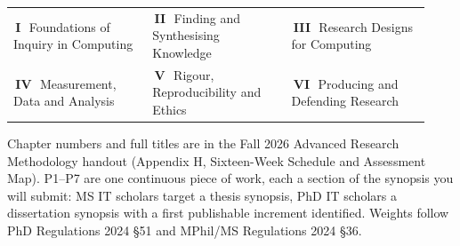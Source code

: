 \documentclass[10pt,a4paper]{article}
\makeatletter
\newcommand{\chipw}[2]{{\setlength{\fboxsep}{1.3pt}\colorbox{#1}{%
  \fontsize{6.4}{7}\selectfont\bfseries\color{white}\,#2\,}}}
\newcommand{\legend}[6]{{\fontsize{6.6}{8}\selectfont\color{sub}%
  \begin{tabular}{@{}p{0.31\linewidth}p{0.31\linewidth}p{0.31\linewidth}@{}}
  \chipw{p1}{I}\ #1 & \chipw{p2}{II}\ #2 & \chipw{p3}{III}\ #3 \\[1pt]
  \chipw{p4}{IV}\ #4 & \chipw{p5}{V}\ #5 & \chipw{p6}{VI}\ #6
  \end{tabular}}}
\makeatother
\begin{document}
\vspace{4pt}
\legend{Foundations of Inquiry in Computing}{Finding and Synthesising Knowledge}{Research Designs for Computing}
       {Measurement, Data and Analysis}{Rigour, Reproducibility and Ethics}{Producing and Defending Research}

\vspace{2pt}
{\fontsize{6.3}{7.6}\selectfont\color{neutral}%
Chapter numbers and full titles are in the Fall 2026 Advanced Research Methodology handout (Appendix H, Sixteen-Week Schedule and Assessment Map). P1--P7 are one continuous piece of work, each a section of the synopsis you will submit: MS IT scholars target a thesis synopsis, PhD IT scholars a dissertation synopsis with a first publishable increment identified.
Weights follow PhD Regulations 2024 \S51 and MPhil/MS Regulations 2024 \S36.\par}
\end{document}

